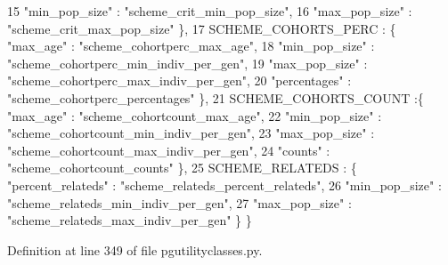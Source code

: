\begin{DoxyCode}
15                             \textcolor{stringliteral}{"min\_pop\_size"} : \textcolor{stringliteral}{"scheme\_crit\_min\_pop\_size"},
16                             \textcolor{stringliteral}{"max\_pop\_size"} : \textcolor{stringliteral}{"scheme\_crit\_max\_pop\_size"} \},
17                 SCHEME\_COHORTS\_PERC : \{ \textcolor{stringliteral}{"max\_age"} : \textcolor{stringliteral}{"scheme\_cohortperc\_max\_age"},
18                                 \textcolor{stringliteral}{"min\_pop\_size"} : \textcolor{stringliteral}{"scheme\_cohortperc\_min\_indiv\_per\_gen"},
19                                 \textcolor{stringliteral}{"max\_pop\_size"} : \textcolor{stringliteral}{"scheme\_cohortperc\_max\_indiv\_per\_gen"},
20                                 \textcolor{stringliteral}{"percentages"} : \textcolor{stringliteral}{"scheme\_cohortperc\_percentages"} \},
21                 SCHEME\_COHORTS\_COUNT :\{ \textcolor{stringliteral}{"max\_age"} : \textcolor{stringliteral}{"scheme\_cohortcount\_max\_age"},
22                                 \textcolor{stringliteral}{"min\_pop\_size"} : \textcolor{stringliteral}{"scheme\_cohortcount\_min\_indiv\_per\_gen"},
23                                 \textcolor{stringliteral}{"max\_pop\_size"} : \textcolor{stringliteral}{"scheme\_cohortcount\_max\_indiv\_per\_gen"},
24                                 \textcolor{stringliteral}{"counts"} : \textcolor{stringliteral}{"scheme\_cohortcount\_counts"} \},
25                 SCHEME\_RELATEDS : \{ \textcolor{stringliteral}{"percent\_relateds"} : \textcolor{stringliteral}{"scheme\_relateds\_percent\_relateds"},
26                             \textcolor{stringliteral}{"min\_pop\_size"} : \textcolor{stringliteral}{"scheme\_relateds\_min\_indiv\_per\_gen"},
27                             \textcolor{stringliteral}{"max\_pop\_size"} : \textcolor{stringliteral}{"scheme\_relateds\_max\_indiv\_per\_gen"} \} \}
\end{DoxyCode}


Definition at line 349 of file pgutilityclasses.\+py.

